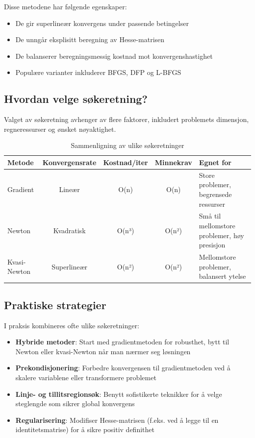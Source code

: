 Disse metodene har følgende egenskaper:
\begin{itemize}
	\item De gir superlineær konvergens under passende betingelser
	\item De unngår eksplisitt beregning av Hesse-matrisen
	\item De balanserer beregningsmessig kostnad mot konvergenshastighet
	\item Populære varianter inkluderer BFGS, DFP og L-BFGS
\end{itemize}

\subsection{Hvordan velge søkeretning?}
\label{sec:search_direction_choice}
Valget av søkeretning avhenger av flere faktorer, inkludert problemets dimensjon, regneressurser og ønsket nøyaktighet.

\begin{table}[H]
	\centering
	\begin{tabular}{lcccl}
		\toprule
		\textbf{Metode} & \textbf{Konvergensrate} & \textbf{Kostnad/iter} & \textbf{Minnekrav} & \textbf{Egnet for}                           \\
		\midrule
		Gradient        & Lineær                  & O(n)                  & O(n)               & Store problemer, begrensede ressurser        \\
		Newton          & Kvadratisk              & O(n³)                 & O(n²)              & Små til mellomstore problemer, høy presisjon \\
		Kvasi-Newton    & Superlineær             & O(n²)                 & O(n²)              & Mellomstore problemer, balansert ytelse      \\
		\bottomrule
	\end{tabular}
	\caption{Sammenligning av ulike søkeretninger}
	\label{tab:search_direction_comparison}
\end{table}

\subsection{Praktiske strategier}
\label{subsec:practical_strategies}

I praksis kombineres ofte ulike søkeretninger:

\begin{itemize}
	\item \textbf{Hybride metoder}: Start med gradientmetoden for robusthet, bytt til Newton eller kvasi-Newton når man nærmer seg løsningen
	\item \textbf{Prekondisjonering}: Forbedre konvergensen til gradientmetoden ved å skalere variablene eller transformere problemet
	\item \textbf{Linje- og tillitsregionsøk}: Benytt sofistikerte teknikker for å velge steglengde som sikrer global konvergens
	\item \textbf{Regularisering}: Modifiser Hesse-matrisen (f.eks. ved å legge til en identitetsmatrise) for å sikre positiv definithet
\end{itemize}

